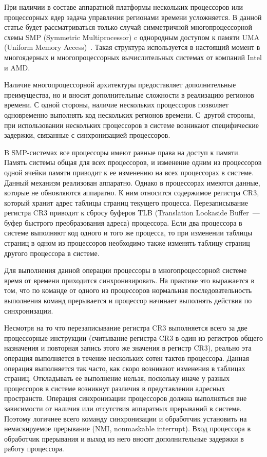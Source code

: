 \begin{multicols}{2}
   При наличии в составе аппаратной платформы нескольких процессоров или процессорных
ядер задача управления регионами времени усложняется. В данной статье будет рассматриваться
только случай симметричной многопроцессорной схемы SMP (Symmetric Multiprocessor) c
однородным доступом к памяти UMA (Uniform Memory Access)~\cite{1eg}. Такая структура
используется в настоящий момент в многоядерных и многопроцессорных вычислительных
системах от компаний Intel и AMD.

   Наличие многопроцессорной архитектуры предо\-став\-ля\-ет дополнительные преимущества, но и
вносит дополнительные сложности в реализацию регионов времени. С одной стороны, наличие
несколь\-ких процессоров позволяет одновременно выполнять код нескольких регионов времени. 
С~другой стороны, при использовании нескольких процессоров в системе возникают специфические
задержки, связанные с синхронизацией процессоров.


   B SMP-системах все процессоры имеют равные права на доступ к памяти. Память системы
общая для всех процессоров, и изменение одним из процессоров одной ячейки памяти приводит к
ее изменению на всех процессорах в системе. Данный механизм реализован аппаратно. Однако в
процессорах имеются данные, которые не обновляются аппаратно. К ним относится содержимое
регистра CR3, который хранит адрес таблицы страниц текущего процесса. Перезаписывание
регистра CR3 приводит к сбросу буферов TLB (Translation Lookaside Buffer~--- буфер быстрого преобразования адреса) процессора. Если два процессора в системе
выполняют код одного и того же процесса, то при изменении таблицы страниц в одном из
процессоров необходимо также изменять таблицу страниц другого процессора в системе.

   Для выполнения данной операции процессоры в многопроцессорной системе время от времени
приходится синхронизировать. На практике это выражается в том, что по команде от одного из
процессоров нормальная последовательность выполнения команд прерывается и процессор
начинает выполнять действия по синхронизации.

Несмотря на то что перезаписывание регистра CR3 выполняется всего за две процессорные
инструкции (считывание регистра CR3 в один из регист\-ров общего назначения и повторная запись
этого же значения в регистр CR3), реально эта операция выполняется в течение нескольких сотен
тактов процессора. Данная операция выполняется так час\-то, как скоро возникают изменения в
таблицах страниц. Откладывать ее выполнение нельзя, поскольку иначе у разных процессоров в
системе возникнут различия в представлении адресных пространств. Операция синхронизации
процессоров должна выполняться вне зависимости от наличия или отсутствия аппаратных
прерываний в системе. Поэтому логичнее всего команду синхронизации и обработчик установить
на немаскируемое прерывание (NMI, nonmaskable interrupt). Вход процессора в обработчик прерывания и выход из него
вносят дополнительные задержки в работу процессора.


\end{multicols}
